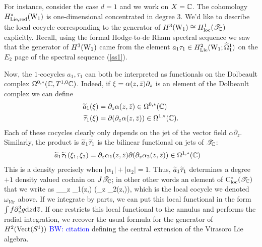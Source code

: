 \documentclass[10pt]{amsart}
\def\brian{\textcolor{blue}{BW: }\textcolor{blue}}
\begin{document}
For instance, consider the case $d=1$ and we work on $X = \CC$. 
The cohomology $H^*_{\rm Lie, red}(\W_1)$ is one-dimensional concentrated in degree $3$. 
We'd like to describe the local cocycle corresponding to the generator of $H^3(\W_1) \cong H^1_{\rm loc}(\sT_{\CC})$ explicitly. 
Recall, using the formal Hodge-to-de Rham spectral sequence we saw that the generator of $H^3(\W_1)$ came from the element $a_1 \tau_1 \in H^2_{\rm Lie} (\W_1 ; \hOmega^1_1)$ on the $E_2$ page of the spectral sequence (\ref{ss1}). 

Now, the $1$-cocycles $a_1,\tau_1$ can both be interpreted as functionals on the Dolbeault complex $\Omega^{0,*}(\CC, T^{1,0}\CC)$. 
Indeed, if $\xi = \alpha(z,\zbar) \partial_z$ is an element of the Dolbeault complex we can define
\begin{align*}
\Tilde{a}_1 (\xi) & = \partial_z \alpha(z,\zbar) \in \Omega^{0,*}(\CC) \\
\Tilde{\tau}_1 (\xi) & = \partial (\partial_z \alpha(z,\zbar)) \in \Omega^{1,*}(\CC) .
\end{align*}
Each of these cocycles clearly only depends on the jet of the vector field $\alpha \partial_z$.
Similarly, the product is $\Tilde{a}_1 \Tilde{\tau}_1$ is the bilinear functional on jets of $\sT_\CC$:
\begin{align*}
\Tilde{a}_1 \Tilde{\tau}_1 (\xi_1,\xi_2) & = \partial_z \alpha_1(z,\zbar)  \partial (\partial_z \alpha_2(z,\zbar)) \in \Omega^{1,*}(\CC)
\end{align*}
This is a density precisely when $|\alpha_1|+|\alpha_2| = 1$.
Thus, $\Tilde{a}_1 \Tilde{\tau}_1$ determines a degree $+1$ density valued cochain on $J \sT_\CC$; in other other words an element of $\cloc^*(\sT_\CC)$ that we write as
\ben
\int_\CC \partial_z \alpha_1(z,\zbar)  \partial (\partial_z \alpha_2(z,\zbar)),
\een
which is the local cocycle we denoted $\omega_{Vir}$ above.
If we integrate by parts, we can put this local functional in the form $\int f \partial^3_z g \d z \d \zbar$.
If one restricts this local functional to the annulus and performs the radial integration, we recover the usual formula for the generator of $H^2({\rm Vect}(S^1))$ \brian{citation} defining the central extension of the Virasoro Lie algebra.



\end{document}
